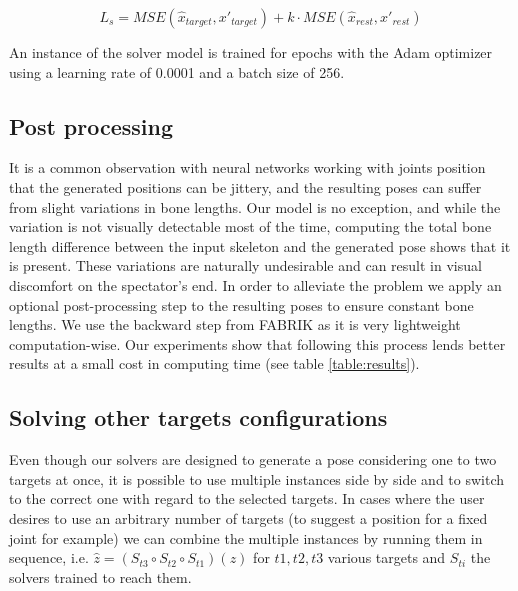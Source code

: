 \begin{equation}
    \label{eq:loss-ik}
    L_{s} = MSE(\hat x_{target}, x'_{target}) + k \cdot MSE(\hat x _{rest}, x'_{rest})
\end{equation}



An instance of the solver model is trained for  epochs with the Adam optimizer using a learning rate of 0.0001 and a batch size of 256.

\subsection{Post processing}

It is a common observation with neural networks working with joints position that the generated positions can be jittery, and the resulting poses can suffer from slight variations in bone lengths. 
Our model is no exception, and while the variation is not visually detectable most of the time, computing the total bone length difference between the input skeleton and the generated pose shows that it is present. These variations are naturally undesirable and can result in visual discomfort on the spectator's end. In order to alleviate the problem we apply an optional post-processing step to the resulting poses to ensure constant bone lengths. We use the backward step from FABRIK as it is very lightweight computation-wise. Our experiments show that following this process  lends better results at a small cost in computing time (see table \ref{table:results}).

\subsection{Solving other targets configurations}
\label{sect:multi-solver}
Even though our solvers are designed to generate a pose considering one to two targets at once, it is possible to use multiple instances side by side and to switch to the correct one with regard to the selected targets. In cases where the user desires to use an arbitrary number of targets
(to suggest a position for a fixed joint for example) we can combine the multiple instances by running them in sequence, i.e. $\hat z = (S_{t3} \circ S_{t2} \circ S_{t1})(z)$ for $t1, t2, t3$ various targets and $S_{ti}$ the solvers trained to reach them.